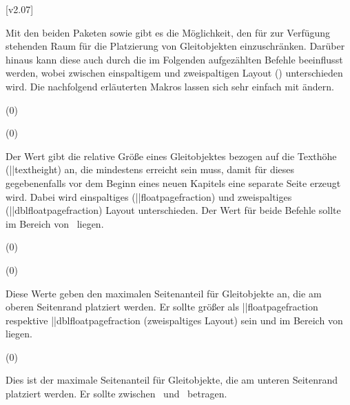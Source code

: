 [v2.07]
\begin{Entity}{}
Mit den beiden Paketen  sowie  gibt es die 
Möglichkeit, den für  zur Verfügung stehenden Raum für die 
Platzierung von Gleitobjekten einzuschränken. Darüber hinaus kann diese auch 
durch die im Folgenden aufgezählten Befehle beeinflusst werden, wobei zwischen 
einspaltigem und zweispaltigen Layout () unterschieden wird. 
Die nachfolgend erläuterten Makros lassen sich sehr einfach mit 
 ändern. 

\begin{Declaration}
  {}
  (0\floatpagefraction)
\begin{Declaration}
  {}
  (0\dblfloatpagefraction)
\printdeclarationlist

Der Wert gibt die relative Größe eines Gleitobjektes bezogen auf die Texthöhe 
(\Length||{textheight}) an, die mindestens erreicht sein muss, damit für dieses 
gegebenenfalls vor dem Beginn eines neuen Kapitels eine separate Seite erzeugt 
wird. Dabei wird einspaltiges (\Macro||{floatpagefraction}) und zweispaltiges 
(\Macro||{dblfloatpagefraction}) Layout unterschieden. Der Wert für beide 
Befehle sollte im Bereich von~ liegen.
\end{Declaration}
\end{Declaration}

\begin{Declaration}
  {}
  (0\topfraction)
\begin{Declaration}
  {}
  (0\dbltopfraction)
\printdeclarationlist

Diese Werte geben den maximalen Seitenanteil für Gleitobjekte an, die am oberen 
Seitenrand platziert werden. Er sollte größer als \Macro||{floatpagefraction} 
respektive \Macro||{dblfloatpagefraction} (zweispaltiges Layout) sein und im 
Bereich von  liegen. 
\end{Declaration}
\end{Declaration}

\begin{Declaration}
  {}
  (0\bottomfraction)
\printdeclarationlist

Dies ist der maximale Seitenanteil für Gleitobjekte, die am unteren Seitenrand 
platziert werden. Er sollte zwischen~ und~ betragen.
\end{Declaration}


\end{Entity}
